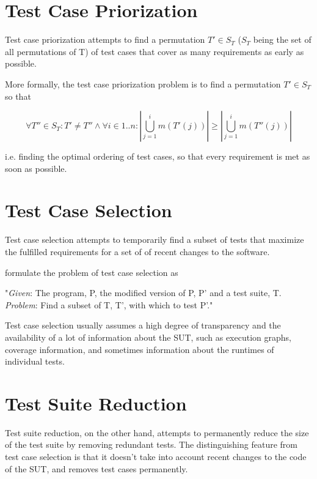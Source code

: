 \section{Test Case Priorization}

Test case priorization attempts to find a permutation $T' \in S_{T}$
($S_{T}$ being the set of all permutations of T) of test cases that
cover as many requirements as early as possible.

More formally, the test case priorization problem is to find a permutation
$T' \in S_{T}$ so that

$$ \forall T'' \in S_{T}: T' \neq T'' \land \forall i \in 1..n: |\bigcup_{j=1}^{i} m(T'(j))| \geq |\bigcup_{j=1}^{i} m(T''(j))| $$

i.e. finding the optimal ordering of test cases, so that every requirement
is met as soon as possible.


\section{Test Case Selection}

Test case selection attempts to temporarily find a subset of tests that
maximize the fulfilled requirements for a set of of recent changes to
the software.

\cite{yoo2012regression} formulate the problem of test case selection as

"\textit{Given}: The program, P, the modified version of P, P' and a test suite, T. \\
\textit{Problem}: Find a subset of T, T', with which to test P'."

Test case selection usually assumes a high degree of transparency and
the availability of a lot of information about the SUT, such as execution
graphs, coverage information, and sometimes information about the runtimes
of individual tests.

\section{Test Suite Reduction}

Test suite reduction, on the other hand, attempts to permanently reduce
the size of the test suite by removing redundant tests. The distinguishing
feature from test case selection is that it doesn't take into account
recent changes to the code of the SUT, and removes test cases permanently.


